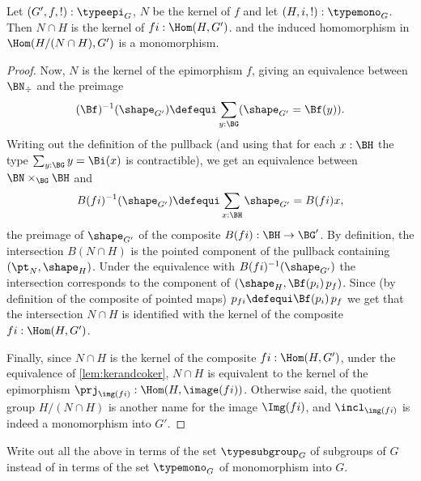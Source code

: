\begin{lemma}
  \label{lem:whatSylow2needs}
  Let $(G',f,!):\typeepi_G$, $N$ be the kernel of $f$  and let $(H,i,!):\typemono_G$.  Then
$N\cap H$ is the kernel of $fi:\Hom(H,G')$.  %
and the induced homomorphism in $\Hom(H/(N\cap H),G')$ is a monomorphism.
  \begin{proof}
Now, $N$ is the kernel of the epimorphism $f$, giving an equivalence between $\BN_\div$ and the preimage
$$(\Bf)^{-1}(\shape_{G'})\defequi\sum_{y:\BG}(\shape_{G'}=\Bf(y)).$$
Writing out the definition of the pullback (and using that for each $x:\BH$ the type $\sum_{y:\BG}y=\Bi(x)$ is contractible), we get an equivalence between $\BN\times_{\BG}\BH$ and
$$B(fi)^{-1}(\shape_{G'})\defequi\sum_{x:\BH}\shape_{G'}=B(fi)x,$$
the preimage of $\shape_{G'}$ of the composite $B(fi):\BH\to \BG'$.
 By definition, the intersection $B(N\cap H)$ is the pointed component of the pullback containing $(\pt_N,\shape_H)$.  Under the equivalence with $B(fi)^{-1}(\shape_{G'})$ the intersection corresponds to the component of $(\shape_H,\Bf(p_i)\,p_f)%
 $.
Since (by definition of the composite of pointed maps) $p_{fi}\defequi \Bf(p_i)\,p_f$ we get that the intersection $N\cap H$ is identified with the kernel of the composite $fi:\Hom(H,G')$.

Finally, since $N\cap H$ is the kernel of the composite $fi:\Hom(H,G')$, under the equivalence of \cref{lem:kerandcoker}, $N\cap H$ is equivalent to the kernel of the epimorphism $\prj_{\img(fi)}:\Hom(H,\image (fi))$.  Otherwise said, the quotient group $H/(N\cap H)$ is another name for the image $\Img (fi)$, and $\incl_{\img(fi)}$ is indeed a monomorphism into $G'$.
  \end{proof}
\end{lemma}
\begin{xca}
  Write out all the above in terms of the set $\typesubgroup_G$ of subgroups of $G$ instead of in terms of the set $\typemono_G$ of monomorphism into $G$.
\end{xca}


